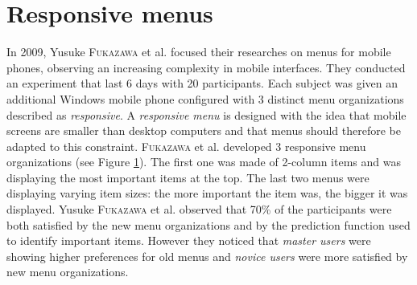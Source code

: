 \section{Responsive menus}
In 2009, Yusuke \textsc{Fukazawa} et al. \cite{fukazawa} focused their 
researches on 
menus for mobile phones, observing an increasing complexity in mobile 
interfaces. They conducted an experiment that last 6 days with 20 participants. 
Each subject was given an additional Windows mobile phone configured with 3 
distinct menu organizations described as \textit{responsive}. A 
\textit{responsive menu} 
is designed with the idea that mobile screens are smaller than desktop 
computers and that menus should therefore be adapted to this constraint. 
\textsc{Fukazawa} et al. developed 3 responsive menu organizations (see 
Figure \ref{fig:fukazawa_menus}). The 
first one was made of 2-column items and was displaying the most important 
items 
at the top. The last two menus were displaying varying item sizes: the more 
important the item was, the bigger it was displayed. Yusuke \textsc{Fukazawa} et 
al. 
observed that 70\% of the participants were both satisfied by the new menu 
organizations and by the prediction function used to identify important items. 
However they noticed that \textit{master users} were showing higher preferences 
for old menus and \textit{novice users} were more satisfied by new menu 
organizations.\newline

\begin{figure}[!ht]
    
    \label{fig:fukazawa_menus}
\end{figure}

